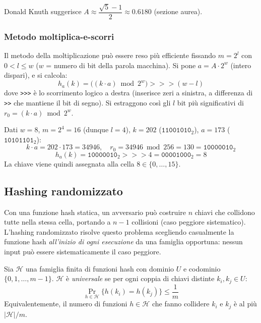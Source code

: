 \begin{nota}
	Donald Knuth suggerisce $A \approx \dfrac{\sqrt{5}-1}{2} \approx 0.6180$
	(sezione aurea).
\end{nota}

\subsubsection{Metodo moltiplica-e-scorri}

Il metodo della moltiplicazione può essere reso più efficiente fissando
$m = 2^l$ con $0 < l \le w$ ($w$ = numero di bit della parola macchina).
Si pone $a = A \cdot 2^w$ (intero dispari), e si calcola:
\[
h_a(k) = \bigl((k \cdot a) \bmod 2^w\bigr) \mathbin{>>>} (w - l)
\]
dove \texttt{>>>} è lo scorrimento logico a destra (inserisce zeri a sinistra,
a differenza di \texttt{>>} che mantiene il bit di segno). Si estraggono così
gli $l$ bit più significativi di $r_0 = (k \cdot a) \bmod 2^w$.

\begin{esempio}[Moltiplica-e-scorri con $w=8$, $m=16$]
	Dati $w = 8$, $m = 2^4 = 16$ (dunque $l = 4$), $k = 202$
	($\mathtt{11001010}_2$), $a = 173$ ($\mathtt{10101101}_2$):
	\[
	k \cdot a = 202 \cdot 173 = 34946, \quad
	r_0 = 34946 \bmod 256 = 130 = \mathtt{10000010}_2
	\]
	\[
	h_a(k) = \mathtt{10000010}_2 \mathbin{>>>} 4 = \mathtt{00001000}_2 = 8
	\]
	La chiave viene quindi assegnata alla cella $8 \in \{0,\ldots,15\}$.
\end{esempio}

\subsection{Hashing randomizzato}

\begin{softnote}
	Con una funzione hash statica, un avversario può costruire $n$ chiavi che
	collidono tutte nella stessa cella, portando a $n-1$ collisioni (caso
	peggiore sistematico). L'hashing randomizzato risolve questo problema
	scegliendo casualmente la funzione hash \emph{all'inizio di ogni esecuzione}
	da una famiglia opportuna: nessun input può essere sistematicamente il caso
	peggiore.
\end{softnote}

\begin{definizione}
	Sia $\mathcal{H}$ una famiglia finita di funzioni hash con dominio $U$ e
	codominio $\{0,1,\ldots,m-1\}$. $\mathcal{H}$ è \emph{universale} se per
	ogni coppia di chiavi distinte $k_i, k_j \in U$:
	\[
	\Pr_{h \in \mathcal{H}}\bigl\{h(k_i) = h(k_j)\bigr\} \le \frac{1}{m}
	\]
	Equivalentemente, il numero di funzioni $h \in \mathcal{H}$ che fanno
	collidere $k_i$ e $k_j$ è al più $|\mathcal{H}|/m$.
\end{definizione}


